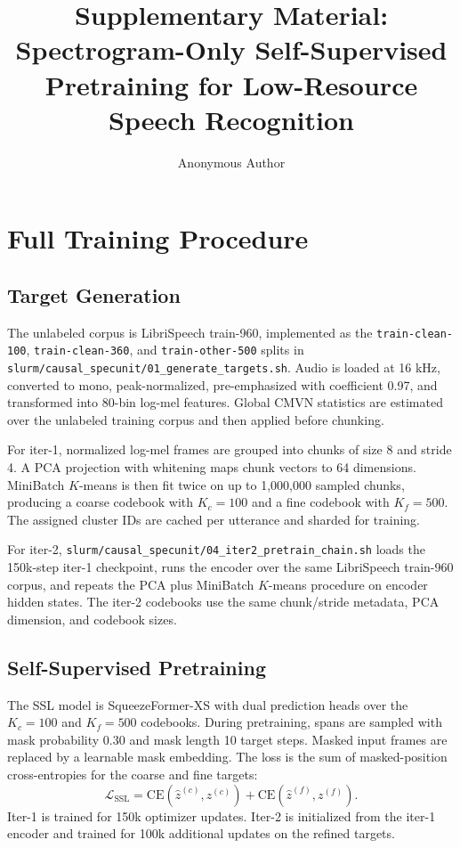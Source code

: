\documentclass{article}
\title{Supplementary Material: Spectrogram-Only Self-Supervised Pretraining for Low-Resource Speech Recognition}
\author{Anonymous Author}
\date{}
\newcommand{\code}[1]{\texttt{#1}}
\begin{document}
\maketitle

\section{Full Training Procedure}

\subsection{Target Generation}
The unlabeled corpus is LibriSpeech train-960, implemented as the
\code{train-clean-100}, \code{train-clean-360}, and \code{train-other-500}
splits in \code{slurm/causal\_specunit/01\_generate\_targets.sh}. Audio is
loaded at 16 kHz, converted to mono, peak-normalized, pre-emphasized with
coefficient 0.97, and transformed into 80-bin log-mel features. Global
CMVN statistics are estimated over the unlabeled training corpus and then
applied before chunking.

For iter-1, normalized log-mel frames are grouped into chunks of size 8 and
stride 4. A PCA projection with whitening maps chunk vectors to 64
dimensions. MiniBatch $K$-means is then fit twice on up to 1,000,000
sampled chunks, producing a coarse codebook with $K_c=100$ and a fine
codebook with $K_f=500$. The assigned cluster IDs are cached per utterance
and sharded for training.

For iter-2, \code{slurm/causal\_specunit/04\_iter2\_pretrain\_chain.sh}
loads the 150k-step iter-1 checkpoint, runs the encoder over the same
LibriSpeech train-960 corpus, and repeats the PCA plus MiniBatch $K$-means
procedure on encoder hidden states. The iter-2 codebooks use the same
chunk/stride metadata, PCA dimension, and codebook sizes.

\subsection{Self-Supervised Pretraining}
The SSL model is SqueezeFormer-XS with dual prediction heads over the
$K_c=100$ and $K_f=500$ codebooks. During pretraining, spans are sampled
with mask probability 0.30 and mask length 10 target steps. Masked input
frames are replaced by a learnable mask embedding. The loss is the sum of
masked-position cross-entropies for the coarse and fine targets:
\[
  \mathcal{L}_{\mathrm{SSL}} =
  \mathrm{CE}(\hat z^{(c)}, z^{(c)}) +
  \mathrm{CE}(\hat z^{(f)}, z^{(f)}).
\]
Iter-1 is trained for 150k optimizer updates. Iter-2 is initialized from
the iter-1 encoder and trained for 100k additional updates on the refined
targets.
\end{document}
